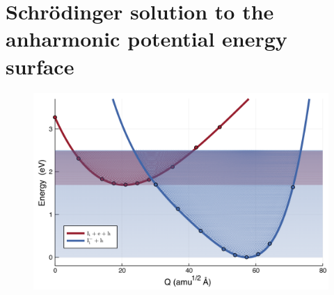 \chapter{\label{app:8-schrodinger}Schr\"{o}dinger solution to the anharmonic potential energy surface}

\begin{landscape}
\begin{figure}[h!]   %
\centering
  \includegraphics[width=0.7\columnwidth]{figures/ap8/potential.png}
  \caption[]{}
\label{schrodinger}
\end{figure}
\end{landscape}
